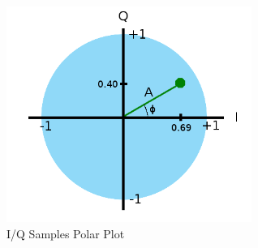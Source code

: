 %
\begin{figure}[here]
	\centering
	\includegraphics[width=8cm]{images/47}
	\caption{I/Q Samples Polar Plot \citep{kuisma-14}}
	\label{fig:kuisma-iq-polar}
\end{figure}
%

